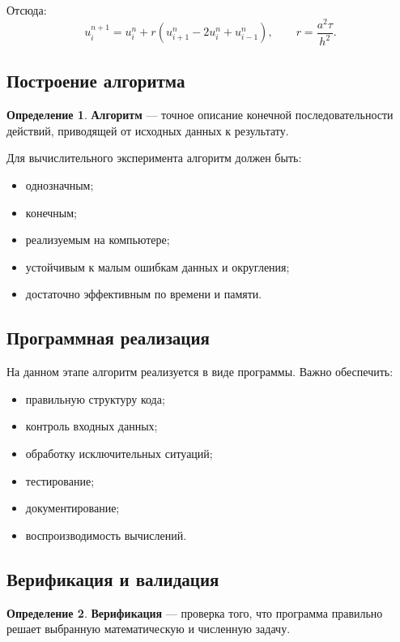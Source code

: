 \documentclass[12pt,a4paper]{article}
\theoremstyle{definition}
\newtheorem{definition}{Определение}
\theoremstyle{plain}
\begin{document}
Отсюда:
\[
u_i^{n+1}
=
u_i^n + r\left(u_{i+1}^n - 2u_i^n + u_{i-1}^n\right),
\qquad
r=\frac{a^2\tau}{h^2}.
\]

\subsection{Построение алгоритма}

\begin{definition}
\textbf{Алгоритм} --- точное описание конечной последовательности действий, приводящей от исходных данных к результату.
\end{definition}

Для вычислительного эксперимента алгоритм должен быть:
\begin{itemize}
    \item однозначным;
    \item конечным;
    \item реализуемым на компьютере;
    \item устойчивым к малым ошибкам данных и округления;
    \item достаточно эффективным по времени и памяти.
\end{itemize}

\subsection{Программная реализация}

На данном этапе алгоритм реализуется в виде программы. Важно обеспечить:
\begin{itemize}
    \item правильную структуру кода;
    \item контроль входных данных;
    \item обработку исключительных ситуаций;
    \item тестирование;
    \item документирование;
    \item воспроизводимость вычислений.
\end{itemize}

\subsection{Верификация и валидация}

\begin{definition}
\textbf{Верификация} --- проверка того, что программа правильно решает выбранную математическую и численную задачу.
\end{definition}
\end{document}
